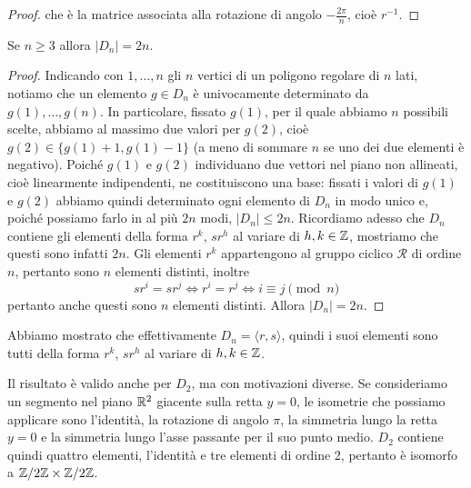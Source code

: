 \documentclass[11pt]{scrartcl}
\begin{document}
\begin{proof}
    che è la matrice associata alla rotazione di angolo $-\displaystyle
    \frac{2\pi}{n}$, cioè $r^{-1}$.
\end{proof}

\begin{proposition}
    Se $n \geqslant 3$ allora $|D_n| = 2n$.
\end{proposition}

\begin{proof}
    Indicando con $1, \ldots, n$ gli $n$ vertici di un poligono regolare di $n$ lati, notiamo
    che un elemento $g \in D_n$ è univocamente determinato da $g(1), \ldots, g(n)$.
    In particolare, fissato $g(1)$, per il quale abbiamo $n$ possibili scelte,
    abbiamo al massimo due valori per $g(2)$, cioè $g(2) \in \{g(1) + 1, g(1) - 1\}$
    (a meno di sommare $n$ se uno dei due elementi è negativo). Poiché $g(1)$
    e $g(2)$ individuano due vettori nel piano non allineati, cioè
    linearmente indipendenti, ne costituiscono una base: fissati i valori di 
    $g(1)$ e $g(2)$ abbiamo quindi determinato ogni
    elemento di $D_n$ in modo unico e, poiché possiamo farlo in al più $2n$ modi, 
    $|D_n| \leqslant 2n$. Ricordiamo adesso che $D_n$ contiene gli elementi
    della forma $r^k$, $sr^h$ al variare di $h, k \in \mathbb Z$, mostriamo che questi sono 
    infatti $2n$. Gli elementi $r^k$ appartengono al gruppo ciclico $\mathcal{R}$
    di ordine $n$, pertanto sono $n$ elementi distinti, inoltre 
    \[
        sr^i = sr^j \iff r^i = r^j\iff i \equiv j \pmod n
    \] pertanto anche questi sono $n$
    elementi distinti. Allora $|D_n| = 2n$.
\end{proof}

\begin{remark}
    Abbiamo mostrato che effettivamente $D_n = \langle r, s\rangle$, quindi i
    suoi elementi sono tutti della forma $r^k$, $sr^h$ al variare di $h, k \in \mathbb Z$. 
\end{remark}

\begin{remark}
    Il risultato è valido anche per $D_2$, ma con motivazioni diverse. 
    Se consideriamo un segmento nel piano $\mathbb R^2$ giacente sulla retta $y = 0$, 
    le isometrie che possiamo applicare sono l'identità, la rotazione di 
    angolo $\pi$, la simmetria lungo la retta $y = 0$ e la simmetria lungo l'asse
    passante per il suo punto medio. $D_2$ contiene quindi quattro elementi,
    l'identità e tre elementi di ordine 2, pertanto è isomorfo a $\mathbb{Z}/{2}\mathbb{Z}\times\mathbb{Z}/{2}\mathbb{Z}$.
\end{remark}
\end{document}
